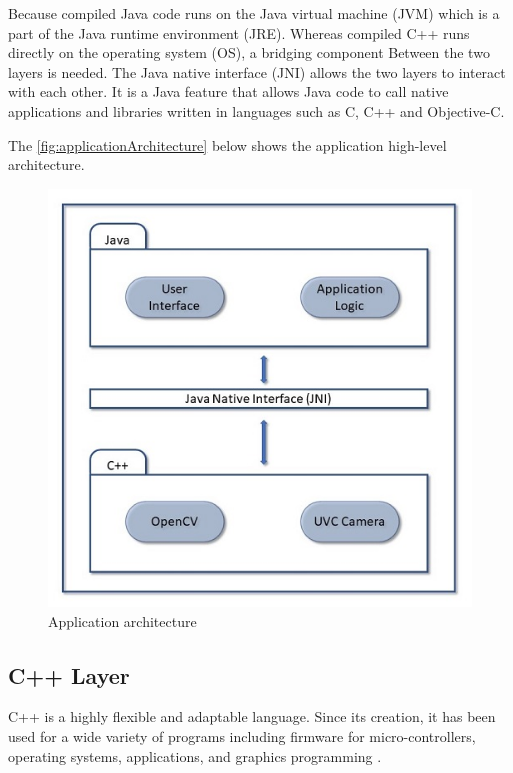 Because compiled Java code runs on the Java virtual machine (JVM) which is a part of the Java runtime environment (JRE). Whereas compiled C++ runs directly on the operating system (OS), a bridging component Between the two layers is needed.
The Java native interface (JNI) allows the two layers to interact with each other. It is a Java feature that allows Java code to call native applications and libraries written in languages such as C, C++ and Objective-C.

The \autoref{fig:applicationArchitecture} below shows the application high-level architecture.


\begin{figure}[H]
\centering
\includegraphics{figures/applicationArchitecture.JPG}

\caption[Application architecture]{Application architecture}\label{fig:applicationArchitecture}
\end{figure}
\subsection{C++ Layer}


C++ is a highly flexible and adaptable language. Since its creation, it has been used for a wide variety of programs including firmware for micro-controllers, operating systems, applications, and graphics programming \parencite{cpp}.

